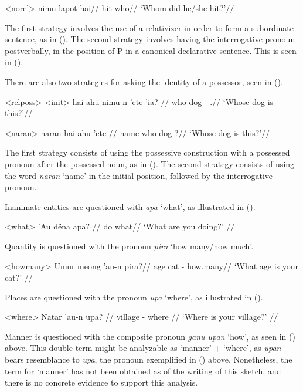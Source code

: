 \documentclass[../hewa_main-subfiles.tex]{subfiles}
\begin{document}
\a<norel> %
\begingl %
\gla nimu lapot hai//
\glb \Third{}\Sg{} hit who//
\glft `Whom did he/she hit?'// 
\endgl
\xe

The first strategy involves the use of a relativizer in order to form a subordinate sentence, as in (). The second strategy involves having the interrogative pronoun postverbally,  in the position of P in a canonical declarative sentence. This is seen in ().

There are also two strategies for asking the identity of a possessor, seen in ().

\pex<relposs> %
\a<init> %
\begingl %
\gla hai ahu nimu-n 'ete 'ia? //
\glb who dog \Third{}\Sg{}-\Poss{} \Dem{} \Def{}.\Sg{}//
\glft `Whose dog is this?'//
\endgl

\a<naran> %
\begingl %
\gla naran hai ahu 'ete //
\glb name who dog \Dem{}?//
\glft `Whose dog is this?'// 
\endgl
\xe

The first strategy consists of using the possessive construction with a possessed pronoun after the possessed noun, as in (). The second strategy consists of using the word \textit{naran} `name' in the initial position, followed by the interrogative pronoun.

Inanimate entities are questioned with \textit{apa} `what', as illustrated in ().

\ex<what>
\begingl %
\gla 'Au dëna apa? //
\glb \Second{}\Sg{} do what//
\glft `What are you doing?' // 
\endgl
\xe

Quantity is questioned with the pronoun \textit{pira} `how many/how much'.

\ex<howmany>
\begingl %
\gla Umur meong 'au-n pira?//
\glb age cat \Second{}\Sg{}-\Poss{} how.many//
\glft `What age is your cat?' // 
\endgl 
\xe


Places are questioned with the pronoun \textit{upa} `where', as illustrated in ().

\ex<where>
\begingl %
\gla Natar 'au-n upa? //
\glb village \Second{}\Sg{}-\Poss{} where //
\glft `Where is your village?' // 
\endgl
\xe 

Manner is questioned with the composite pronoun \textit{ganu upan} `how', as seen in () above. This double term might be analyzable as `manner' + `where', as \textit{upan} bears resemblance to \textit{upa}, the pronoun exemplified in () above. Nonetheless, the term for `manner' has not been obtained as of the writing of this sketch, and there is no concrete evidence to support this analysis.
\end{document}

